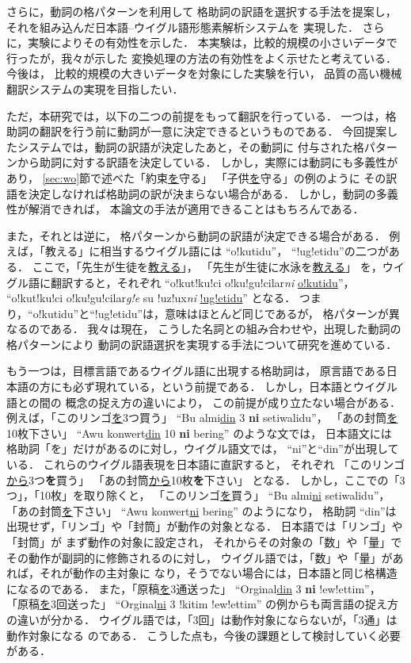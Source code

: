 さらに，動詞の格パターンを利用して
格助詞の訳語を選択する手法を提案し，
それを組み込んだ日本語--ウイグル語形態素解析システムを
実現した．
さらに，実験によりその有効性を示した．
本実験は，比較的規模の小さいデータで行ったが，我々が示した
変換処理の方法の有効性をよく示せたと考えている．
今後は，
比較的規模の大きいデータを対象にした実験を行い，
品質の高い機械翻訳システムの実現を目指したい．


ただ，本研究では，以下の二つの前提をもって翻訳を行っている．
一つは，格助詞の翻訳を行う前に動詞が一意に決定できるというものである．
今回提案したシステムでは，動詞の訳語が決定したあと，その動詞に
付与された格パターンから助詞に対する訳語を決定している．
しかし，実際には動詞にも多義性があり，
\ref{sec:wo}節で述べた「約束\underline{を}守る」
「子供\underline{を}守る」の例のように
その訳語を決定しなければ格助詞の訳が決まらない場合がある．
しかし，動詞の多義性が解消できれば，
本論文の手法が適用できることはもちろんである．

また，それとは逆に，
格パターンから動詞の訳語が決定できる場合がある．
例えば，「教える」に相当するウイグル語には
``o!kutidu''， ``!ug!etidu''の二つがある．
ここで，「先生が生徒を\underline{教える}」，
「先生が生徒に水泳を\underline{教える}」
を，ウイグル語に翻訳すると，それぞれ
``o!kut!ku!ci o!ku!gu!cilar{\it ni} \underline{o!kutidu}''，
``o!kut!ku!ci o!ku!gu!cilar{\it g!e} su !uz!ux{\it ni} \underline{!ug!etidu}''
となる．
つまり，``o!kutidu''と``!ug!etidu''は，意味はほとんど同じであるが，
格パターンが異なるのである．
我々は現在，
こうした名詞との組み合わせや，出現した動詞の格パターンにより
動詞の訳語選択を実現する手法について研究を進めている．

もう一つは，目標言語であるウイグル語に出現する格助詞は，
原言語である日本語の方にも必ず現れている，という前提である．
しかし，日本語とウイグル語との間の
概念の捉え方の違いにより，
この前提が成り立たない場合がある．
例えば，「このリンゴ\underline{を}3つ買う」
``Bu almi\underline{din} 
3 {\bf ni} setiwalidu''，
「あの封筒\underline{を}10枚下さい」
``Awu konwert\underline{din} 10 {\bf ni} bering''
のような文では，
日本語文には
格助詞「を」だけがあるのに対し，ウイグル語文では，
``ni''と``din''が出現している．
これらのウイグル語表現を日本語に直訳すると，
それぞれ
「このリンゴ\underline{から}3つ{\bf を}買う」
「あの封筒\underline{から}10枚{\bf を}下さい」
となる．
しかし，ここでの「3つ」，「10枚」を取り除くと，
「このリンゴ\underline{を}買う」
``Bu almi\underline{ni} setiwalidu''，
「あの封筒\underline{を}下さい」
``Awu konwert\underline{ni} bering''
のようになり，
格助詞 ``din''は出現せず，「リンゴ」や「封筒」が動作の対象となる．
日本語では「リンゴ」や「封筒」が
まず動作の対象に設定され，
それからその対象の「数」や「量」でその動作が副詞的に修飾されるのに対し，
ウイグル語では，「数」や「量」があれば，それが動作の主対象に
なり，そうでない場合には，日本語と同じ格構造になるのである．
また，「原稿\underline{を}3通送った」
``Orginal\underline{din} 3 {\bf ni} !ew!ettim''，
「原稿\underline{を}3回送った」
``Orginal\underline{ni} 3 !kitim !ew!ettim''
の例からも両言語の捉え方の違いが分かる．
ウイグル語では，「3回」は動作対象にならないが，「3通」は動作対象になる
のである．
こうした点も，今後の課題として検討していく必要がある．


